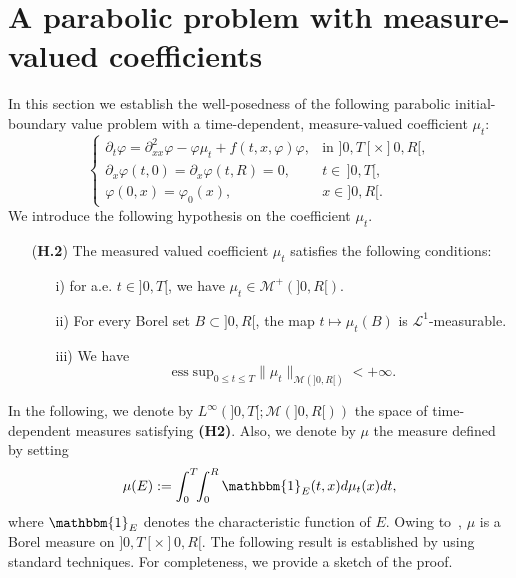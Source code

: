 \documentclass[11pt,leqno]{amsart}
\numberwithin{equation}{section}
\begin{document}
\section{A parabolic problem with measure-valued coefficients}
\label{sec:3}
In this section we establish the well-posedness of the following parabolic initial-boundary
value problem with a time-dependent, measure-valued coefficient $\mu_t$:
\begin{equation}
  \label{eq:2}
  \begin{cases}
    {\partial_t}{\varphi} = {\partial_{xx}^2}{\varphi} - {\varphi} \mu_t + f(t,x,{\varphi}) {\varphi},
    & \text{in $]0, T[ \times ]0, R[$},
    \\
      {\partial_x } {\varphi}(t,0)={\partial_x }{\varphi}(t,R) = 0, & t \in \, ]0, T[,
     \\
    {\varphi}(0,x)={\varphi}_0(x),
    & x\in{]0,R[}.
  \end{cases}
\end{equation}
We introduce the following hypothesis on the coefficient $\mu_t$.
\begin{itemize}
\item[({\bf H.2})] \label{h:accatre}
The measured valued coefficient  $\mu_t$ satisfies the following conditions: 
\begin{itemize}
\item[i)] for a.e. $t \in ]0, T[$, we have $\mu_t \in \mathcal M^+ (]0, R[).$
\item[ii)] For every Borel set $B \subset ]0, R[$, the map
$
      t \mapsto \mu_t  (B)
$
is $\mathcal L^1$-measurable. 
\item[iii)] We have 
\begin{equation}
\label{e:h:finito}
    \mathrm{ess \; sup}_{0\le t\le T} \| \mu_t \|_{\mathcal M (]0,R[)} < + \infty. 
\end{equation}
\end{itemize}
\end{itemize}
In the following, we denote
by $L^\infty (]0, T[; \mathcal M(]0, R[))$
the space of time-dependent measures 
satisfying {\bf(H2)}. Also, we denote by  
$\mu$ the measure defined by setting
\begin{equation}
\label{e:cosaemu}
    \mu (E) : = \int_0^T \! \! \int_0^R 
    \mathbbm{1}_E (t, x) d \mu_t (x) dt,
\end{equation}
where $\mathbbm{1}_E $ denotes the characteristic function of $E$. 
Owing to~\cite[Proposition 2.26]{AmbrosioFuscoPallara}, $\mu$ is a Borel measure on $]0, T[ \times ]0, R[$. The following result is established by using standard techniques. For completeness, we provide a sketch of the proof. 
\end{document}
